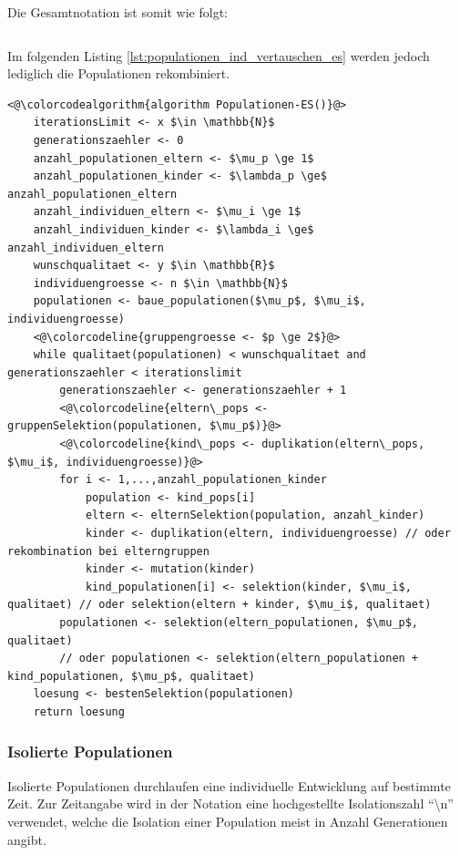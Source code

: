 Die Gesamtnotation ist somit wie folgt:

\begin{equation}
[\mu_p / p_p \# \lambda_p (\mu_i / p_i \# \lambda_i)]
\end{equation}

Im folgenden Listing \ref{lst:populationen_ind_vertauschen_es} werden jedoch lediglich die Populationen rekombiniert.


\begin{lstlisting}[caption={Evolutionsstrategien mit mehreren Populationen und Individuentausch}, firstnumber=1, captionpos=b, label=lst:populationen_ind_vertauschen_es]
<@\colorcodealgorithm{algorithm Populationen-ES()}@>
	iterationsLimit <- x $\in \mathbb{N}$
	generationszaehler <- 0
	anzahl_populationen_eltern <- $\mu_p \ge 1$
	anzahl_populationen_kinder <- $\lambda_p \ge$ anzahl_populationen_eltern
	anzahl_individuen_eltern <- $\mu_i \ge 1$
	anzahl_individuen_kinder <- $\lambda_i \ge$ anzahl_individuen_eltern
	wunschqualitaet <- y $\in \mathbb{R}$
	individuengroesse <- n $\in \mathbb{N}$
	populationen <- baue_populationen($\mu_p$, $\mu_i$, individuengroesse)
	<@\colorcodeline{gruppengroesse <- $p \ge 2$}@>
	while qualitaet(populationen) < wunschqualitaet and generationszaehler < iterationslimit
		generationszaehler <- generationszaehler + 1
		<@\colorcodeline{eltern\_pops <- gruppenSelektion(populationen, $\mu_p$)}@>
		<@\colorcodeline{kind\_pops <- duplikation(eltern\_pops, $\mu_i$, individuengroesse)}@>
		for i <- 1,...,anzahl_populationen_kinder
			population <- kind_pops[i]
			eltern <- elternSelektion(population, anzahl_kinder)
			kinder <- duplikation(eltern, individuengroesse) // oder rekombination bei elterngruppen
			kinder <- mutation(kinder)
			kind_populationen[i] <- selektion(kinder, $\mu_i$, qualitaet) // oder selektion(eltern + kinder, $\mu_i$, qualitaet)
		populationen <- selektion(eltern_populationen, $\mu_p$, qualitaet)
		// oder populationen <- selektion(eltern_populationen + kind_populationen, $\mu_p$, qualitaet)
	loesung <- bestenSelektion(populationen)
	return loesung
\end{lstlisting}

\subsubsection{Isolierte Populationen}

Isolierte Populationen durchlaufen eine individuelle Entwicklung auf bestimmte Zeit.
Zur Zeitangabe wird in der Notation eine hochgestellte Isolationszahl \enquote{\textbackslash n} verwendet, welche die Isolation einer Population meist in Anzahl Generationen angibt.

